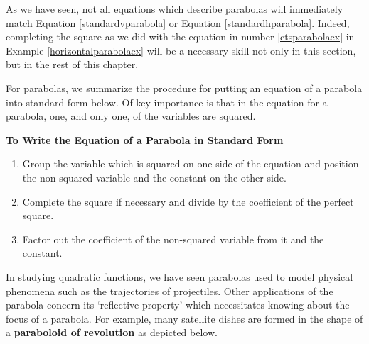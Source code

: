 \documentclass{ximera}
\begin{document}
As we have seen, not all equations which describe parabolas will immediately match Equation \ref{standardvparabola} or Equation \ref{standardhparabola}.  Indeed, completing the square as we did with the equation in number \ref{ctsparabolaex} in Example \ref{horizontalparabolaex}  will be a necessary skill not only in this section, but in the rest of this chapter. 

\smallskip

 For parabolas, we summarize the procedure for putting an equation of a parabola into standard form below.  Of key importance is that in the equation for a parabola, one, and only one, of the variables are squared.

\smallskip

\colorbox{ResultColor}{\bbm

\centerline{\textbf{To Write the Equation of a Parabola in Standard Form}}

\begin{enumerate}

\item  Group the variable which is squared on one side of the equation and position the non-squared variable and the constant on the other side.

\item  Complete the square if necessary and divide by the coefficient of the perfect square.

\item  Factor out the coefficient of the non-squared variable from it and the constant.

\end{enumerate}

\ebm}

\smallskip

\label{paraboloid}
In studying quadratic functions, we have seen parabolas used to model physical phenomena such as the trajectories of projectiles.  Other applications of the parabola concern its `reflective property' which necessitates knowing about the focus of a parabola.  For example, many satellite dishes are formed in the shape of a  \textbf{paraboloid of revolution} as depicted below.
\end{document}
